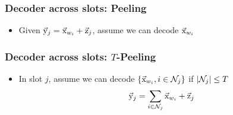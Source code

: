 \documentclass[10pt]{beamer}
\def\mac_figpath{../Figures/MAC}
\begin{document}
\begin{frame}\frametitle{Decoder across slots: Peeling}
\begin{itemize}
\item Given $\vec{\mathrm{y}}_j=\vec{\mathrm{x}}_{w_i}+\vec{\mathrm{z}}_j$, assume we can decode $\vec{\mathrm{x}}_{w_i}$
\end{itemize}
\centering
\end{frame}

\begin{frame}
\frametitle{Decoder across slots: $T$-Peeling}
\begin{itemize}
\item In slot $j$, assume we can decode $\{\vec{\mathrm{x}}_{w_i},i\in\mathcal{N}_j\}$ if $|\mathcal{N}_j|\leq T$
\[
\vec{\mathrm{y}}_j=\sum\limits_{i\in\mathcal{N}_j}\vec{\mathrm{x}}_{w_i}+\vec{\mathrm{z}}_j
\]
\end{itemize}
\centering

\end{frame}
\end{document}
